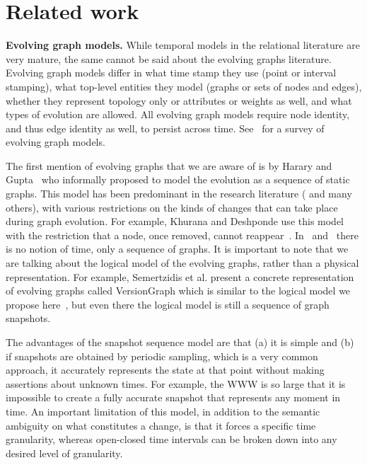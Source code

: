 \section{Related work}
\label{sec:related}

{\bf Evolving graph models.}  While temporal models in the relational
literature are very mature, the same cannot be said about the evolving
graphs literature.  Evolving graph models differ in what time stamp
they use (point or interval stamping), what top-level entities they
model (graphs or sets of nodes and edges), whether they represent
topology only or attributes or weights as well, and what types of
evolution are allowed.  All evolving graph models require node
identity, and thus edge identity as well, to persist across time.
See~\cite{Zaki2016} for a survey of evolving graph models.

The first mention of evolving graphs that we are aware of is by Harary
and Gupta~\cite{Harary1997} who informally proposed to model the
evolution as a sequence of static graphs.  This model has been
predominant in the research literature
(\cite{Fard2012,Khurana2013,Ren2011}
and many others), with various restrictions on the kinds of changes
that can take place during graph evolution.  For example, Khurana and
Deshponde use this model with the restriction that a node, once
removed, cannot reappear~\cite{Khurana2013}.  In~\cite{Fard2012}
and~\cite{Ren2011} there is no notion of time, only a sequence of
graphs.  It is important
to note that we are talking about the logical model of the evolving
graphs, rather than a physical representation.  For example,
Semertzidis et al. present a concrete representation of evolving
graphs called VersionGraph which is similar to the logical model we
propose here~\cite{Semertzidis2015}, but even there the logical model
is still a sequence of graph snapshots.

The advantages of the snapshot sequence model are that (a) it is
simple and (b) if snapshots are obtained by periodic sampling, which
is a very common approach, it accurately represents the state at that
point without making assertions about unknown times.  For example, the
WWW is so large that it is impossible to create a fully accurate
snapshot that represents any moment in time.  An important limitation
of this model, in addition to the semantic ambiguity on what
constitutes a change, is that it forces a specific time granularity,
whereas open-closed time intervals can be broken down into any desired
level of granularity.

